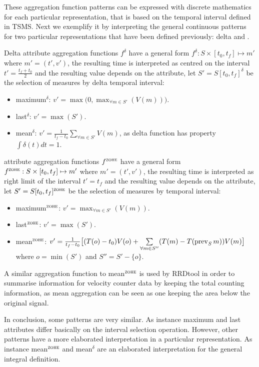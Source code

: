 These aggregation function patterns can be expressed with discrete
mathematics for each particular representation, that is based on the
temporal interval defined in TSMS. Next we exemplify it by
interpreting the general continuous patterns for two particular
representations that have been defined previously: delta and \zohe{}.


Delta attribute aggregation functions $f^\delta$ have a general form
$f^\delta : S \times [t_0,t_f]\mapsto m'$ where $m'=(t',v')$, the
resulting time is interpreted as centred on the interval
$t'=\frac{t_f+t_0}{2}$ and the resulting value depends on the
attribute, let $S'=S[t_0,t_f]^\delta$ be the selection of measures by
delta temporal interval:
\begin{itemize}
\item maximum$^\delta$: $v' = \max\big(0,\max_{\forall m \in S'}(V(m))\big)$. 
\item last$^\delta$: $v' = \max(S')$.
\item mean$^\delta$: $v' = \frac{1}{t_f-t_0} \sum\limits_{\forall m
    \in S'} V(m)$, as delta function has property $\int\delta(t)dt=1$.
\end{itemize}


\zohe{} attribute aggregation functions $f^\zohe{}$ have a general
form $f^\zohe{} : S \times [t_0,t_f]\mapsto m'$ where $m'=(t',v')$,
the resulting time is interpreted as right limit of the interval
$t'=t_f$ and the resulting value depends on the attribute, let
$S'=S[t_0,t_f]^\zohe{}$ be the selection of measures by \zohe{} temporal
interval:
\begin{itemize}
\item maximum$^\zohe{}$: $v' = \max_{\forall m \in S'}(V(m))$. 
\item last$^\zohe{}$: $v' = \max(S')$.
\item mean$^\zohe{}$: $v' = \frac{1}{t_f-t_0} \big[ (T(o)-t_0)V(o) +
  \sum\limits_{\forall m \in S''}( T(m)- T(\operatorname*{prev}_S
  m) )V(m) \big]$ where $o=\min(S')$ and $S''= S' - \{o\}$.
\end{itemize}

A similar aggregation function to mean$^\zohe{}$ is used by RRDtool
\cite{rrdtool} in order to summarise information for velocity coun\-ter
data by keeping the total counting information, as mean aggregation
can be seen as one keeping the area below the original signal.


In conclusion, some patterns are very similar. As instance maximum and
last attributes differ basically on the interval selection
operation. However, other patterns have a more elaborated
interpretation in a particular representation. As instance
mean$^\zohe{}$ and mean$^\delta$ are an elaborated interpretation for
the general integral definition.





